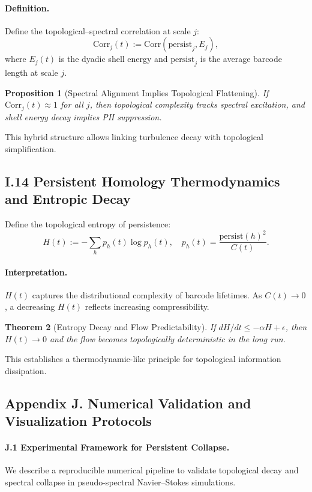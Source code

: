 \documentclass[11pt]{article}
\newtheorem{theorem}{Theorem}[section]
\newtheorem{proposition}[theorem]{Proposition}
\theoremstyle{definition}
\begin{document}
\paragraph{Definition.} Define the topological–spectral correlation at scale $j$:
\[ \mathrm{Corr}_j(t) := \mathrm{Corr}(\text{persist}_j, E_j), \]
where $E_j(t)$ is the dyadic shell energy and $\text{persist}_j$ is the average barcode length at scale $j$.

\begin{proposition}[Spectral Alignment Implies Topological Flattening]
If $\mathrm{Corr}_j(t) \approx 1$ for all $j$, then topological complexity tracks spectral excitation, and shell energy decay implies PH suppression.
\end{proposition}

This hybrid structure allows linking turbulence decay with topological simplification.

\subsection*{I.14 Persistent Homology Thermodynamics and Entropic Decay}

Define the topological entropy of persistence:
\[ H(t) := -\sum_h p_h(t) \log p_h(t), \quad p_h(t) = \frac{\text{persist}(h)^2}{C(t)}. \]

\paragraph{Interpretation.} $H(t)$ captures the distributional complexity of barcode lifetimes.
As $C(t) \to 0$, a decreasing $H(t)$ reflects increasing compressibility.

\begin{theorem}[Entropy Decay and Flow Predictability]
If $dH/dt \leq -\alpha H + \epsilon$, then $H(t) \to 0$ and the flow becomes topologically deterministic in the long run.
\end{theorem}

This establishes a thermodynamic-like principle for topological information dissipation.


\subsection*{Appendix J. Numerical Validation and Visualization Protocols}

\paragraph{J.1 Experimental Framework for Persistent Collapse.}
We describe a reproducible numerical pipeline to validate topological decay and spectral collapse in pseudo-spectral Navier--Stokes simulations.
\end{document}
